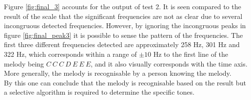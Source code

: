 Figure \ref{fig:final_3} accounts for the output of test 2. It is seen compared to the result of the scale that the significant frequencies are not as clear due to several incongruous detected frequencies. However, by ignoring the incongruous peaks in figure \ref{fig:final_peak3} it is possible to sense the pattern of the frequencies. The first three different frequencies detected are approximately 258 Hz, 301 Hz and 322 Hz, which corresponds within a range of $\pm 10$ Hz to the first line of the melody being $C \ C \ C \ D \ E \ E \ E$, and it also visually corresponds with the time axis. More generally, the melody is recognisable by a person knowing the melody. \\
By this one can conclude that the melody is recognisable based on the result but a selective algorithm is required to determine the specific tones.                  

